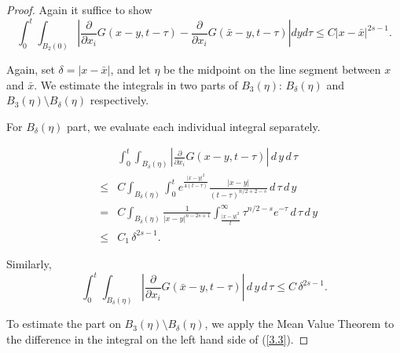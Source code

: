 \documentclass[12pt]{article}
\theoremstyle{remark}
\numberwithin{equation}{section}
\begin{document}
\begin{proof} Again it suffice to show
\begin{equation}
\int_0^t \int_{B_2(0)} | \frac{\partial}{\partial x_i} G(x-y, t-\tau) - \frac{\partial}{\partial x_i} G(\bar{x}-y, t-\tau) | d y d \tau  \leq C |x-\bar{x}|^{2s-1}.
\label{3.3}
\end{equation}

Again, set $\delta = |x-\bar{x}|$, and let $\eta$ be the midpoint on the line segment between $x$ and $\bar{x}$. We estimate the integrals in two parts of $B_3(\eta)$: $B_\delta (\eta)$ and $B_3(\eta) \setminus B_\delta (\eta)$ respectively.

For $B_\delta (\eta)$ part, we evaluate each individual integral separately.

\begin{eqnarray}
& & \int_0^t \int_{B_\delta (\eta)} \left| \frac{\partial}{\partial x_i} G(x-y, t-\tau) \right| \, d \, y \, d\, \tau \nonumber \\
& \leq & C  \int_{B_\delta (\eta)} \int_0^t e^{\frac{|x-y|^2}{4(t-\tau)}} \frac{|x-y|}{(t-\tau)^{n/2+2-s}} \, d \, \tau \, d\, y \nonumber \\
& = & C \int_{B_\delta (\eta)} \frac{1}{|x-y|^{n-2s +1}} \int_{\frac{|x-y|^2}{t}} ^\infty \tau^{n/2-s} e^{-\tau}  \, d \, \tau \, d\, y \nonumber \\
& \leq & C_1 \, \delta^{2s-1}.
\label{3.9}
\end{eqnarray}

Similarly,
\begin{equation}   \int_0^t \int_{B_\delta (\eta)} \left| \frac{\partial}{\partial x_i} G(\bar{x}-y, t-\tau) \right| \, d \, y \, d\, \tau \leq C \, \delta^{2s-1}.
\label{3.10}
\end{equation}

To estimate the part on $B_3(\eta) \setminus B_\delta (\eta)$, we apply the Mean Value Theorem to the difference in the integral on the left hand side of (\ref{3.3}).


\end{proof}
\end{document}
